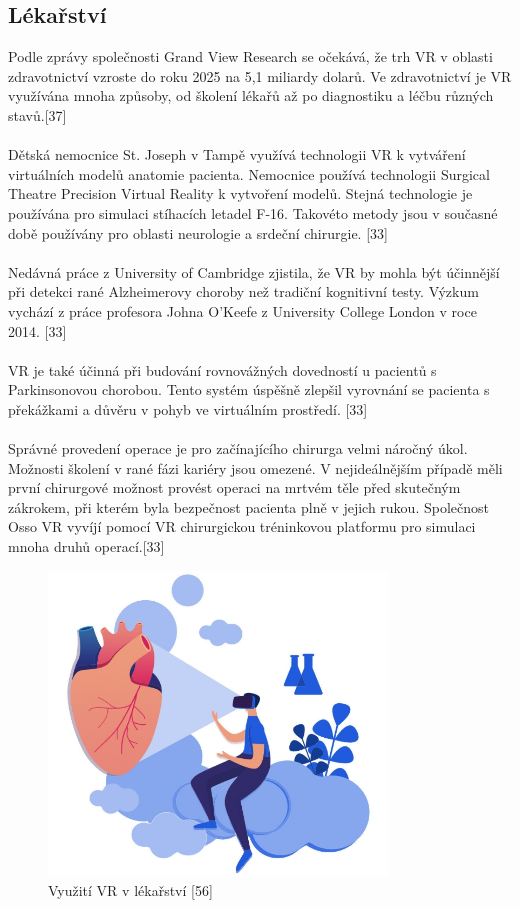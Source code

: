 \documentclass[a4paper, 12pt]{report}
\begin{document}
\subsection{Lékařství}
Podle zprávy společnosti Grand View Research se očekává, že trh VR v oblasti zdravotnictví vzroste do roku 2025 na 5,1 miliardy dolarů. Ve zdravotnictví je VR využívána mnoha způsoby, od školení lékařů až po diagnostiku a léčbu různých stavů.[37]\\
\\
Dětská nemocnice St. Joseph v Tampě využívá  technologii VR k vytváření virtuálních modelů anatomie pacienta. Nemocnice používá  technologii Surgical Theatre Precision Virtual Reality k vytvoření modelů. Stejná technologie je používána pro simulaci stíhacích letadel F-16. Takovéto metody jsou v současné době používány pro oblasti neurologie a srdeční chirurgie. [33]\\
\\
Nedávná práce z University of Cambridge zjistila, že VR by mohla být účinnější při detekci rané Alzheimerovy choroby než tradiční kognitivní testy. Výzkum vychází z práce profesora Johna O'Keefe z University College London v roce 2014. [33]\\
\\
VR je také účinná při budování rovnovážných dovedností u pacientů s Parkinsonovou chorobou. Tento systém úspěšně zlepšil vyrovnání se pacienta s překážkami a důvěru v pohyb ve virtuálním prostředí. [33]\\
\\
Správné provedení operace je pro začínajícího chirurga velmi náročný úkol. Možnosti školení v rané fázi kariéry jsou omezené. V nejideálnějším případě měli první chirurgové možnost provést operaci na mrtvém těle před skutečným zákrokem, při kterém byla bezpečnost pacienta plně v jejich rukou.  Společnost Osso VR vyvíjí pomocí VR chirurgickou tréninkovou platformu pro simulaci mnoha druhů operací.[33]

\begin{figure}[h!]
	\centering
	\includegraphics[width=9cm]{lekarstvi.jpg}
	\caption{Využití VR v lékařství [56]}
\end{figure}
\end{document}
